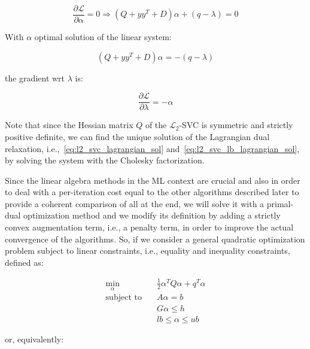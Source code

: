 \begin{equation} \label{eq:l2_svc_lb_lagrangian_der_a}
	\frac{\partial \mathcal{L}}{\partial \alpha}=0\Rightarrow (Q + yy^T + D) \alpha + (q - \lambda) = 0
\end{equation}

With $\alpha$ optimal solution of the linear system:

\begin{equation} \label{eq:l2_svc_lb_lagrangian_sol}
    (Q + yy^T + D) \alpha = - (q - \lambda)
\end{equation}

the gradient wrt $\lambda$ is:

\begin{equation} \label{eq:l2_svc_lb_lagrangian_der_l}
    \frac{\partial \mathcal{L}}{\partial \lambda}=-\alpha
\end{equation}

\bigskip

Note that since the Hessian matrix $Q$ of the $\mathcal{L}_2$-SVC is symmetric and strictly positive definite, we can find the unique solution of the Lagrangian dual relaxation, i.e.,~\ref{eq:l2_svc_lagrangian_sol} and~\ref{eq:l2_svc_lb_lagrangian_sol}, by solving the system with the Cholesky factorization.

\bigskip

Since the linear algebra methods in the ML context are crucial and also in order to deal with a per-iteration cost equal to the other algorithms described later to provide a coherent comparison of all at the end, we will solve it with a primal-dual optimization method and we modify its definition by adding a strictly convex augmentation term, i.e., a penalty term, in order to improve the actual convergence of the algorithms. So, if we consider a general quadratic optimization problem subject to linear constraints, i.e., equality and inequality constraints, defined as:

\begin{equation}
    \begin{aligned} 
        \min_{\alpha} \quad & \frac{1}{2} \alpha^T Q \alpha + q^T \alpha \\
            \textrm{subject to} \quad & A \alpha = b \\ & G \alpha \leq h \\ & lb \leq \alpha \leq ub
    \end{aligned}
\end{equation}

or, equivalently:

